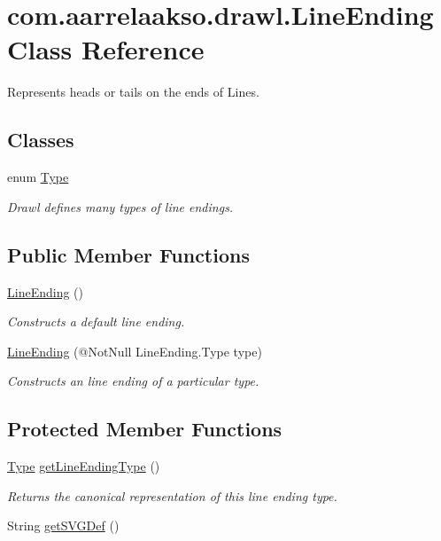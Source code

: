 \hypertarget{classcom_1_1aarrelaakso_1_1drawl_1_1_line_ending}{}\section{com.\+aarrelaakso.\+drawl.\+Line\+Ending Class Reference}
\label{classcom_1_1aarrelaakso_1_1drawl_1_1_line_ending}


Represents heads or tails on the ends of Lines.  


\subsection*{Classes}
\begin{DoxyCompactItemize}
\item 
enum \hyperlink{enumcom_1_1aarrelaakso_1_1drawl_1_1_line_ending_1_1_type}{Type}
\begin{DoxyCompactList}\small\item\em Drawl defines many types of line endings. \end{DoxyCompactList}\end{DoxyCompactItemize}
\subsection*{Public Member Functions}
\begin{DoxyCompactItemize}
\item 
\hyperlink{classcom_1_1aarrelaakso_1_1drawl_1_1_line_ending_ae3ae4bbd1469b24e585b8626872c66a9}{Line\+Ending} ()
\begin{DoxyCompactList}\small\item\em Constructs a default line ending. \end{DoxyCompactList}\item 
\hyperlink{classcom_1_1aarrelaakso_1_1drawl_1_1_line_ending_acd36154a030301e72b9c41de1b42d8bf}{Line\+Ending} (@Not\+Null Line\+Ending.\+Type type)
\begin{DoxyCompactList}\small\item\em Constructs an line ending of a particular type. \end{DoxyCompactList}\end{DoxyCompactItemize}
\subsection*{Protected Member Functions}
\begin{DoxyCompactItemize}
\item 
\hyperlink{enumcom_1_1aarrelaakso_1_1drawl_1_1_line_ending_1_1_type}{Type} \hyperlink{classcom_1_1aarrelaakso_1_1drawl_1_1_line_ending_a37d765d892d173660eef0f321781f455}{get\+Line\+Ending\+Type} ()
\begin{DoxyCompactList}\small\item\em Returns the canonical representation of this line ending type. \end{DoxyCompactList}\item 
String \hyperlink{classcom_1_1aarrelaakso_1_1drawl_1_1_line_ending_a30fe25c0bc92fe34abffcd1b16248605}{get\+S\+V\+G\+Def} ()
\end{DoxyCompactItemize}
